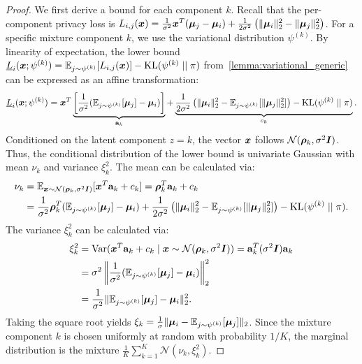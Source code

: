 \begin{proof}
    We first derive a bound for each component $k$. Recall that the per-component privacy loss is $L_{i,j}({\bm{x}}) = \frac{1}{\sigma^2} {\bm{x}}^T ({\bm{\mu}}_j - {\bm{\mu}}_i) + \frac{1}{2\sigma^2} \left( \|{\bm{\mu}}_i\|_2^2 - \|{\bm{\mu}}_j\|_2^2 \right)$.
    For a specific mixture component $k$, we use the variational distribution $\psi^{(k)}$. By linearity of expectation, the lower bound $\underline{L}_i({\bm{x}}; \psi^{(k)}) = \mathbb{E}_{j \sim \psi^{(k)}} [L_{i,j}({\bm{x}})] - \mathrm{KL}(\psi^{(k)} \mid\mid \pi)$ from~\cref{lemma:variational_generic} can be expressed as an affine transformation:
    \begin{equation*}
        \underline{L}_i({\bm{x}}; \psi^{(k)}) = {\bm{x}}^T \underbrace{\left[ \frac{1}{\sigma^2} (\mathbb{E}_{j \sim \psi^{(k)}}[{\bm{\mu}}_j] - {\bm{\mu}}_i) \right]}_{\mathbf{a}_k} + \underbrace{\frac{1}{2\sigma^2} \left( \|{\bm{\mu}}_i\|_2^2 - \mathbb{E}_{j \sim \psi^{(k)}}[\|{\bm{\mu}}_j\|_2^2] \right) - \mathrm{KL}(\psi^{(k)} \mid\mid \pi)}_{c_k}.
    \end{equation*}
    Conditioned on the latent component $z=k$, the vector ${\bm{x}}$ follows $\mathcal{N}({\bm{\rho}}_k, \sigma^2 {\bm{I}})$. Thus, the conditional distribution of the lower bound is univariate Gaussian with mean $\nu_k$ and variance $\xi_k^2$.
    The mean can be calculated via:
    \begin{align*}
        \nu_k &= \mathbb{E}_{{\bm{x}} \sim \mathcal{N}({\bm{\rho}}_k, \sigma^2 {\bm{I}})} [{\bm{x}}^T \mathbf{a}_k + c_k] = {\bm{\rho}}_k^T \mathbf{a}_k + c_k \\
        &= \frac{1}{\sigma^2} {\bm{\rho}}_k^T (\mathbb{E}_{j \sim \psi^{(k)}}[{\bm{\mu}}_j] - {\bm{\mu}}_i) + \frac{1}{2\sigma^2} \left( \|{\bm{\mu}}_i\|_2^2 - \mathbb{E}_{j \sim \psi^{(k)}}[\|{\bm{\mu}}_j\|_2^2] \right) - \mathrm{KL}(\psi^{(k)} \mid\mid \pi).
    \end{align*}
    The variance $\xi_k^2$ can be calculated via:
    \begin{align*}
        \xi_k^2 &= \mathrm{Var}({\bm{x}}^T \mathbf{a}_k + c_k \mid {\bm{x}} \sim \mathcal{N}({\bm{\rho}}_k, \sigma^2 {\bm{I}})) = \mathbf{a}_k^T (\sigma^2 {\bm{I}}) \mathbf{a}_k \\
        &= \sigma^2 \left\| \frac{1}{\sigma^2} (\mathbb{E}_{j \sim \psi^{(k)}}[{\bm{\mu}}_j] - {\bm{\mu}}_i) \right\|_2^2 \\
        &= \frac{1}{\sigma^2} \| \mathbb{E}_{j \sim \psi^{(k)}}[{\bm{\mu}}_j] - {\bm{\mu}}_i \|_2^2.
    \end{align*}
    Taking the square root yields $\xi_k = \frac{1}{\sigma} \| {\bm{\mu}}_i - \mathbb{E}_{j \sim \psi^{(k)}}[{\bm{\mu}}_j] \|_2$. Since the mixture component $k$ is chosen uniformly at random with probability $1/K$, the marginal distribution is the mixture $\frac{1}{K} \sum_{k=1}^K \mathcal{N}(\nu_k, \xi_k^2)$.
\end{proof}
